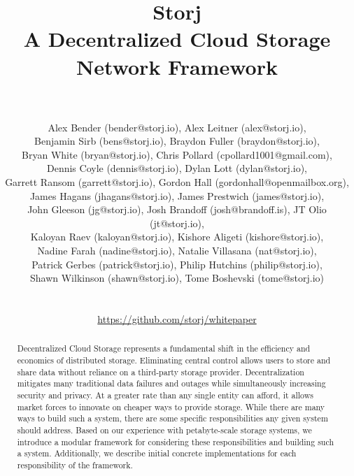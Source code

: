 \documentclass[a4paper,10pt]{article} \usepackage[utf8]{inputenc}
\title{\textbf{Storj\\A Decentralized Cloud Storage Network Framework}}
\author{\\ \parbox{\linewidth}{\centering\small Alex Bender (bender@storj.io),
Alex Leitner (alex@storj.io),\\ Benjamin Sirb (bens@storj.io), Braydon Fuller
(braydon@storj.io),\\ Bryan White (bryan@storj.io), Chris Pollard
(cpollard1001@gmail.com),\\ Dennis Coyle (dennis@storj.io), Dylan Lott
(dylan@storj.io),\\ Garrett Ransom (garrett@storj.io), Gordon Hall
(gordonhall@openmailbox.org),\\ James Hagans (jhagans@storj.io), James 
Prestwich (james@storj.io),\\ John Gleeson (jg@storj.io), Josh Brandoff
(josh@brandoff.is), JT Olio (jt@storj.io),\\ Kaloyan Raev (kaloyan@storj.io),
Kishore Aligeti (kishore@storj.io),\\ Nadine Farah (nadine@storj.io), Natalie
Villasana (nat@storj.io),\\ Patrick Gerbes (patrick@storj.io), Philip Hutchins
(philip@storj.io),\\ Shawn Wilkinson (shawn@storj.io), Tome Boshevski
(tome@storj.io)}\\\\\small \url{https://github.com/storj/whitepaper} }\date
\begin{document}
\maketitle

\begin{abstract}

Decentralized Cloud Storage represents a fundamental shift in
the efficiency and economics of distributed storage.
Eliminating central control allows users to store and share data
without reliance on a third-party storage provider. Decentralization mitigates
many traditional data failures and outages while simultaneously increasing
security and privacy. At a greater rate than any single entity can afford, it 
allows market forces to innovate on cheaper ways to provide storage. 
While there are many ways to build such a system, there are some specific 
responsibilities any given system should address. 
Based on our experience with petabyte-scale
storage systems, we introduce a modular framework for considering these
responsibilities and building such a system. Additionally, we describe initial 
concrete implementations for each responsibility of the framework. 
\end{abstract}
\end{document}
